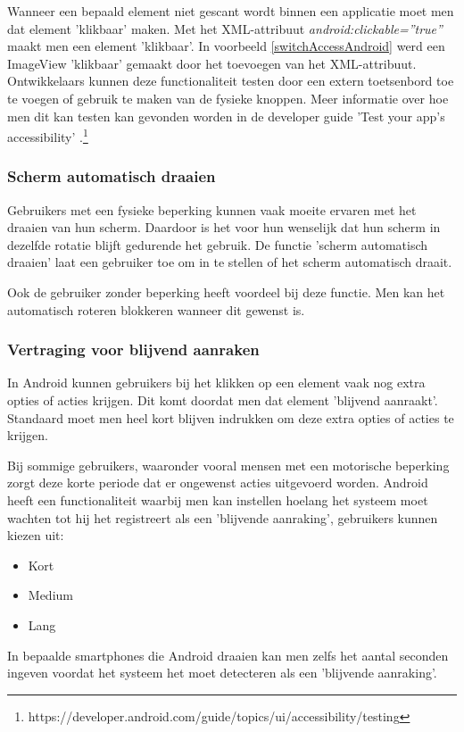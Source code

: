 Wanneer een bepaald element niet gescant wordt binnen een applicatie moet men dat element 'klikbaar' maken. Met het XML-attribuut \emph{android:clickable=''true''} maakt men een element 'klikbaar'. In voorbeeld \ref{switchAccessAndroid} werd een ImageView 'klikbaar' gemaakt door het toevoegen van het XML-attribuut.
\\
Ontwikkelaars kunnen deze functionaliteit testen door een extern toetsenbord toe te voegen of gebruik te maken van de fysieke knoppen. Meer informatie over hoe men dit kan testen kan gevonden worden in de developer guide 'Test your app's accessibility' .\footnote{https://developer.android.com/guide/topics/ui/accessibility/testing}
\subsubsection{Scherm automatisch draaien}
Gebruikers met een fysieke beperking kunnen vaak moeite ervaren met het draaien van hun scherm. Daardoor is het voor hun wenselijk dat hun scherm in dezelfde rotatie blijft gedurende het gebruik. De functie 'scherm automatisch draaien' laat een gebruiker toe om in te stellen of het scherm automatisch draait.

Ook de gebruiker zonder beperking heeft voordeel bij deze functie. Men kan het automatisch roteren blokkeren wanneer dit gewenst is.

\subsubsection{Vertraging voor blijvend aanraken}
In Android kunnen gebruikers bij het klikken op een element vaak nog extra opties of acties krijgen. Dit komt doordat men dat element 'blijvend aanraakt'. Standaard moet men heel kort blijven indrukken om deze extra opties of acties te krijgen. 

Bij sommige gebruikers, waaronder vooral mensen met een motorische beperking zorgt deze korte periode dat er ongewenst acties uitgevoerd worden. Android heeft een functionaliteit waarbij men kan instellen hoelang het systeem moet wachten tot hij het registreert als een 'blijvende aanraking', gebruikers kunnen kiezen uit:
\begin{itemize}
    \item Kort
    \item Medium
    \item Lang
\end{itemize}
In bepaalde smartphones die Android draaien kan men zelfs het aantal seconden ingeven voordat het systeem het moet detecteren als een 'blijvende aanraking'. 

